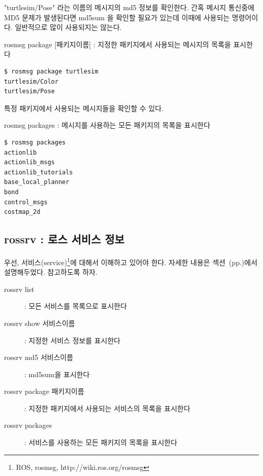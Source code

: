 \noindent
"turtlesim/Pose" 라는 이름의 메시지의 md5 정보를 확인한다. 간혹 메시지 통신중에 MD5 문제가 발생된다면 md5sum 을 확인할 필요가 있는데 이때에 사용되는 명령어이다. 일반적으로 많이 사용되지는 않는다.

\vspace{\baselineskip}
\noindent
{}\circled{\thenum} rosmsg package [패키지이름] : 지정한 패키지에서 사용되는 메시지의 목록을 표시한다

\begin{lstlisting}[language=ROS]
$ rosmsg package turtlesim 
turtlesim/Color
turtlesim/Pose
\end{lstlisting}

\noindent
특정 패키지에서 사용되는 메시지들을 확인할 수 있다.

\vspace{\baselineskip}
\noindent
{}\circled{\thenum} rosmsg packages : 메시지를 사용하는 모든 패키지의 목록을 표시한다

\begin{lstlisting}[language=ROS]
$ rosmsg packages
actionlib
actionlib_msgs
actionlib_tutorials
base_local_planner
bond
control_msgs
costmap_2d
\end{lstlisting}

\subsection{rossrv : 로스 서비스 정보}

우선, 서비스(service)\footnote{ROS, rosmsg, http://wiki.ros.org/rosmsg}에 대해서 이해하고 있어야 한다. 자세한 내용은 섹션~(pp.\pageref{def:RosService})에서 설명해두었다. 참고하도록 하자.

\vspace{\baselineskip}
\noindent
\begin{description}
\item[rossrv list] : 모든 서비스를 목록으로 표시한다
\item[rossrv show 서비스이름] : 지정한 서비스 정보를 표시한다
\item[rossrv md5 서비스이름] : md5sum을 표시한다
\item[rossrv package 패키지이름] : 지정한 패키지에서 사용되는 서비스의 목록을 표시한다
\item[rossrv packages] : 서비스를 사용하는 모든 패키지의 목록을 표시한다
\end{description}

